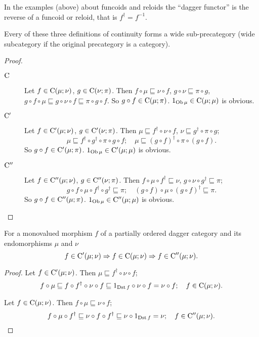 \begin{rem}
In the examples (above) about funcoids and reloids the ``dagger functor''
is the reverse of a funcoid or reloid, that is $f^{\dagger}=f^{-1}$.\end{rem}
\begin{prop}
Every of these three definitions of continuity forms a wide sub-precategory
(wide subcategory if the original precategory is a category).\end{prop}
\begin{proof}
~
\begin{description}
\item [{$\mathrm{C}$}] Let $f\in\mathrm{C}(\mu;\nu)$, $g\in\mathrm{C}(\nu;\pi)$.
Then $f\circ\mu\sqsubseteq\nu\circ f$, $g\circ\nu\sqsubseteq\pi\circ g$,
$g\circ f\circ\mu\sqsubseteq g\circ\nu\circ f\sqsubseteq\pi\circ g\circ f$.
So $g\circ f\in\mathrm{C}(\mu;\pi)$. $1_{\operatorname{Ob}\mu}\in\mathrm{C}(\mu;\mu)$
is obvious.
\item [{$\mathrm{C}'$}] Let $f\in\mathrm{C}'(\mu;\nu)$, $g\in\mathrm{C}'(\nu;\pi)$.
Then $\mu\sqsubseteq f^{\dagger}\circ\nu\circ f$, $\nu\sqsubseteq g^{\dagger}\circ\pi\circ g$;
\[
\mu\sqsubseteq f^{\dagger}\circ g^{\dagger}\circ\pi\circ g\circ f;\quad\mu\sqsubseteq(g\circ f)^{\dagger}\circ\pi\circ(g\circ f).
\]
So $g\circ f\in\mathrm{C}'(\mu;\pi)$. $1_{\operatorname{Ob}\mu}\in\mathrm{C}'(\mu;\mu)$
is obvious.
\item [{$\mathrm{C}''$}] Let $f\in\mathrm{C}''(\mu;\nu)$, $g\in\mathrm{C}''(\nu;\pi)$.
Then $f\circ\mu\circ f^{\dagger}\sqsubseteq\nu$, $g\circ\nu\circ g^{\dagger}\sqsubseteq\pi$;
\[
g\circ f\circ\mu\circ f^{\dagger}\circ g^{\dagger}\sqsubseteq\pi;\quad(g\circ f)\circ\mu\circ(g\circ f)^{\dagger}\sqsubseteq\pi.
\]
So $g\circ f\in\mathrm{C}''(\mu;\pi)$. $1_{\operatorname{Ob}\mu}\in\mathrm{C}''(\mu;\mu)$
is obvious.
\end{description}
\end{proof}
\begin{prop}
For a monovalued morphism $f$ of a partially ordered dagger category
and its endomorphisms $\mu$ and $\nu$ 
\[
f\in\mathrm{C}'(\mu;\nu)\Rightarrow f\in\mathrm{C}(\mu;\nu)\Rightarrow f\in\mathrm{C}''(\mu;\nu).
\]
\end{prop}
\begin{proof}
Let $f\in\mathrm{C}'(\mu;\nu)$. Then $\mu\sqsubseteq f^{\dagger}\circ\nu\circ f$;
\[
f\circ\mu\sqsubseteq f\circ f^{\dagger}\circ\nu\circ f\sqsubseteq1_{\operatorname{Dst} f}\circ\nu\circ f=\nu\circ f;\quad f\in\mathrm{C}(\mu;\nu).
\]


Let $f\in\mathrm{C}(\mu;\nu)$. Then $f\circ\mu\sqsubseteq\nu\circ f$;
\[
f\circ\mu\circ f^{\dagger}\sqsubseteq\nu\circ f\circ f^{\dagger}\sqsubseteq\nu\circ1_{\operatorname{Dst} f}=\nu;\quad f\in\mathrm{C}''(\mu;\nu).
\]
\end{proof}
